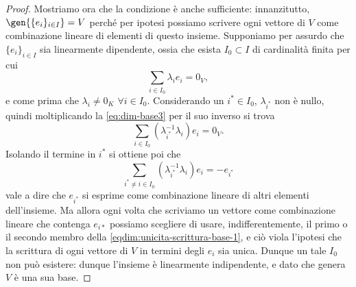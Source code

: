 \begin{proof}
	Mostriamo ora che la condizione è anche sufficiente: innanzitutto, $\gen{\{e_i\}_{i\in I}}=V$ perché per ipotesi possiamo scrivere ogni vettore di $V$ come combinazione lineare di elementi di questo insieme.
	Supponiamo per assurdo che $\{e_i\}_{i\in I}$ sia linearmente dipendente, ossia che esista $I_0\subset I$ di cardinalità finita per cui
	\begin{equation} \label{eq:dim-base3}
		\sum_{i\in I_0}\lambda_ie_i=0_V,
	\end{equation}
	e come prima che $\lambda_i\neq 0_K$ $\forall i\in I_0$.
	Considerando un $i^*\in I_0$, $\lambda_{i^*}$ non è nullo, quindi moltiplicando la \eqref{eq:dim-base3} per il suo inverso si trova
	\begin{equation*}
		\sum_{i\in I_0}(\lambda_{i^*}^{-1}\lambda_i)e_i=0_V.
	\end{equation*}
	Isolando il termine in $i^*$ si ottiene poi che
	\begin{equation}
		\sum_{i^*\neq i\in I_0}(\lambda_{i^*}^{-1}\lambda_i)e_i=-e_{i^*}
		\label{eqdim:unicita-scrittura-base-1}
	\end{equation}
	vale a dire che $e_{i^*}$ si esprime come combinazione lineare di altri elementi dell'insieme.
	Ma allora ogni volta che scriviamo un vettore come combinazione lineare che contenga $e_{i*}$ possiamo scegliere di usare, indifferentemente, il primo o il secondo membro della \eqref{eqdim:unicita-scrittura-base-1}, e ciò viola l'ipotesi che la scrittura di ogni vettore di $V$ in termini degli $e_i$ sia unica.
	Dunque un tale $I_0$ non può esistere: dunque l'insieme è linearmente indipendente, e dato che genera $V$ è una sua base.
\end{proof}

